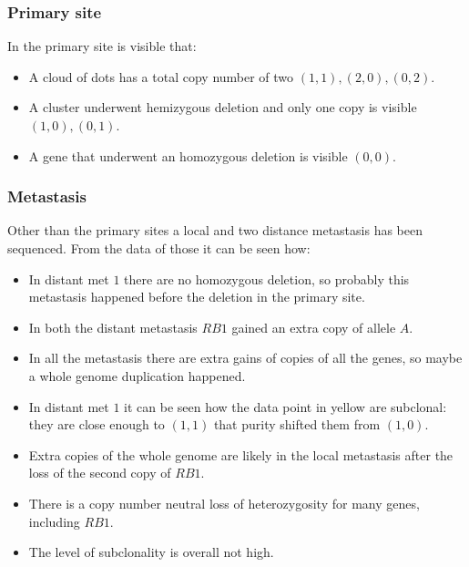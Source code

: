    \subsubsection{Primary site}
    In the primary site is visible that:

    \begin{multicols}{2}
      \begin{itemize}
        \item A cloud of dots has a total copy number of two $(1,1),(2,0),(0,2)$.
        \item A cluster underwent hemizygous deletion and only one copy is visible $(1,0),(0,1)$.
        \item A gene that underwent an homozygous deletion is visible $(0,0)$.
      \end{itemize}
    \end{multicols}

   \subsubsection{Metastasis}
    Other than the primary sites a local and two distance metastasis has been sequenced.
    From the data of those it can be seen how:

    \begin{multicols}{2}
      \begin{itemize}
        \item In distant met $1$ there are no homozygous deletion, so probably this metastasis happened before the deletion in the primary site.
        \item In both the distant metastasis $RB1$ gained an extra copy of allele $A$.
        \item In all the metastasis there are extra gains of copies of all the genes, so maybe a whole genome duplication happened.
        \item In distant met $1$ it can be seen how the data point in yellow are subclonal: they are close enough to $(1,1)$ that purity shifted them from $(1,0)$.
        \item Extra copies of the whole genome are likely in the local metastasis after the loss of the second copy of $RB1$.
        \item There is a copy number neutral loss of heterozygosity for many genes, including $RB1$.
        \item The level of subclonality is overall not high.
      \end{itemize}
    \end{multicols}


